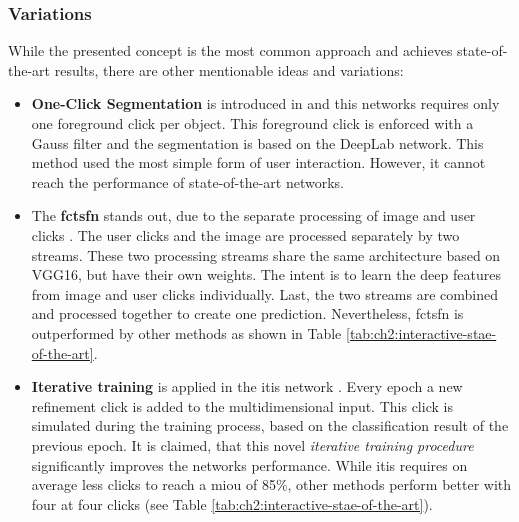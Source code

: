 \subsubsection{Variations}
While the presented concept is the most common approach and achieves state-of-the-art results, there are other mentionable ideas and variations:
\begin{itemize}
	\item \textbf{One-Click Segmentation} is introduced in \cite{Maj20-One-Click} and this networks requires only one foreground click per object.
	This foreground click is enforced with a Gauss filter and the segmentation is based on the DeepLab network.
	This method used the most simple form of user interaction.
	However, it cannot reach the performance of state-of-the-art networks.
	
	\item The \textbf{\gls{fctsfn}} stands out, due to the separate processing of image and user clicks \cite{Hu19-TwoStreamFusionNetwork}.
	The user clicks and the image are processed separately by two streams.
	These two processing streams share the same architecture based on VGG16, but have their own weights.
	The intent is to learn the deep features from image and user clicks individually.
	Last, the two streams are combined and processed together to create one prediction.
	Nevertheless, \gls{fctsfn} is outperformed by other methods as shown in Table \ref{tab:ch2:interactive-stae-of-the-art}.
	
	\item \textbf{Iterative training} is applied in the \gls{itis} network \cite{MVL18-ITIS}.
	Every epoch a new refinement click is added to the multidimensional input.
	This click is simulated during the training process, based on the classification result of the previous epoch.
	It is claimed, that this novel \textit{iterative training procedure} significantly improves the networks performance.
	While \gls{itis} requires on average less clicks to reach a \gls{miou} of 85\%, other methods perform better with four at four clicks (see Table \ref{tab:ch2:interactive-stae-of-the-art}).
	
\end{itemize}


